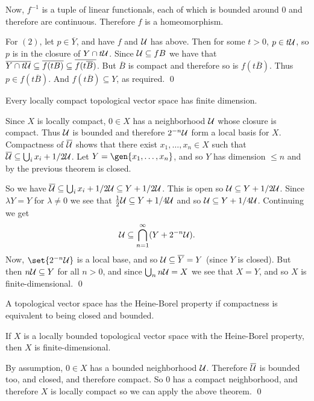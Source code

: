     Now, $f^{-1}$ is a tuple of linear functionals, each of which is bounded around $0$ and therefore are continuous.
    Therefore $f$ is a homeomorphism.

    For $(2)$, let $p\in\overline Y$, and have $f$ and ${\cal U}$ has above.
    Then for some $t>0$, $p\in t{\cal U}$, so $p$ is in the closure of $Y\cap t{\cal U}$.
    Since ${\cal U}\subseteq fB$ we have that $\overline{Y\cap t{\cal U}}\subseteq\overline{f(tB)}\subseteq\overline{f(t\overline B)}$.
    But $\overline B$ is compact and therefore so is $f(t\overline B)$.
    Thus $p\in f(t\overline B)$.
    And $f(t\overline B)\subseteq Y$, as required.
    \qed

\eproof

\bthrm

    Every locally compact topological vector space has finite dimension.

\ethrm

\bproof

    Since $X$ is locally compact, $0\in X$ has a neighborhood ${\cal U}$ whose closure is compact.
    Thus ${\cal U}$ is bounded and therefore $2^{-n}{\cal U}$ form a local basis for $X$.
    Compactness of $\overline{{\cal U}}$ shows that there exist $x_1,\dots,x_n\in X$ such that $\overline{{\cal U}}\subseteq\bigcup_ix_i+1/2{\cal U}$.
    Let $Y=\gen{x_1,\dots,x_n}$, and so $Y$ has dimension $\leq n$ and by the previous theorem is closed.

    So we have $\overline{{\cal U}}\subseteq\bigcup_ix_i+1/2{\cal U}\subseteq Y+1/2{\cal U}$.
    This is open so ${\cal U}\subseteq Y+1/2{\cal U}$.
    Since $\lambda Y=Y$ for $\lambda\neq0$ we see that ${{1}\over{2}}{\cal U}\subseteq Y+1/4{\cal U}$ and so ${\cal U}\subseteq Y+1/4{\cal U}$.
    Continuing we get
    $$ {\cal U} \subseteq \bigcap_{n=1}^\infty(Y+2^{-n}{\cal U}) . $$
    Now, $\set{2^{-n}\U}$ is a local base, and so ${\cal U}\subseteq\overline Y=Y$ (since $Y$ is closed).
    But then $n{\cal U}\subseteq Y$ for all $n>0$, and since $\bigcup_nn{\cal U}=X$ we see that $X=Y$, and so $X$ is finite-dimensional.
    \qed

\eproof

\bdefn

    A topological vector space has the {\emphcolor Heine-Borel property} if compactness is equivalent to being closed and bounded.

\edefn

\bthrm

    If $X$ is a locally bounded topological vector space with the Heine-Borel property, then $X$ is finite-dimensional.

\ethrm

\bproof

    By assumption, $0\in X$ has a bounded neighborhood ${\cal U}$.
    Therefore $\overline{{\cal U}}$ is bounded too, and closed, and therefore compact.
    So $0$ has a compact neighborhood, and therefore $X$ is locally compact so we can apply the above theorem.
    \qed

\eproof

